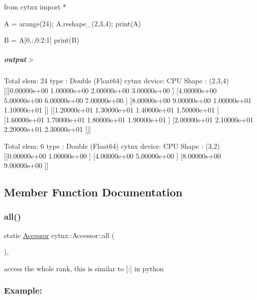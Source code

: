 \begin{DoxyCodeInclude}
\textcolor{keyword}{from} cytnx \textcolor{keyword}{import} *

A = arange(24);
A.reshape\_(2,3,4);
print(A)


B = A[0,:,0:2:1]
print(B)

\end{DoxyCodeInclude}
 \subparagraph*{output$>$}


\begin{DoxyVerbInclude}

Total elem: 24
type  : Double (Float64)
cytnx device: CPU
Shape : (2,3,4)
[[[0.00000e+00 1.00000e+00 2.00000e+00 3.00000e+00 ]
  [4.00000e+00 5.00000e+00 6.00000e+00 7.00000e+00 ]
  [8.00000e+00 9.00000e+00 1.00000e+01 1.10000e+01 ]]
 [[1.20000e+01 1.30000e+01 1.40000e+01 1.50000e+01 ]
  [1.60000e+01 1.70000e+01 1.80000e+01 1.90000e+01 ]
  [2.00000e+01 2.10000e+01 2.20000e+01 2.30000e+01 ]]]



Total elem: 6
type  : Double (Float64)
cytnx device: CPU
Shape : (3,2)
[[0.00000e+00 1.00000e+00 ]
 [4.00000e+00 5.00000e+00 ]
 [8.00000e+00 9.00000e+00 ]]




\end{DoxyVerbInclude}
 

\subsection{Member Function Documentation}
\mbox{\label{classcytnx_1_1Accessor_a71b8c4af7182a2c9144929bdef9ff4fd}} 
\subsubsection{\texorpdfstring{all()}{all()}}
{\footnotesize\ttfamily static \hyperlink{classcytnx_1_1Accessor}{Accessor} cytnx\+::\+Accessor\+::all (\begin{DoxyParamCaption}{ }\end{DoxyParamCaption})\hspace{0.3cm}{\ttfamily [inline]}, {\ttfamily [static]}}



access the whole rank, this is similar to \mbox{[}\+:\mbox{]} in python 

\subsubsection*{Example\+:}

